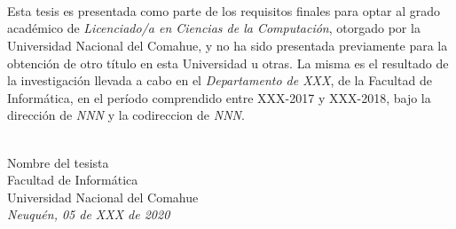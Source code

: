 \ \\
\ \\
\label{pagpref}
\\
\ \\
\ \\
\ \\
\ \\
\ \\

Esta tesis es presentada como parte de los requisitos finales para optar al grado académico de {\em Licenciado/a en Ciencias de la Computación}, otorgado por la Universidad Nacional del Comahue, y no ha sido presentada previamente para la obtención de otro título en esta Universidad u otras. La misma es el resultado de la investigación llevada a cabo en el \emph{Departamento de XXX}, de la Facultad de Informática, en el período comprendido entre XXX-2017 y XXX-2018, bajo la dirección de \emph{NNN} y la codireccion de \emph{NNN}.



\vspace{3cm}


\ \\
{\flushright Nombre del tesista\\
{\sc Facultad de Informática \\
Universidad Nacional del Comahue}\\
{\em Neuqu\'en, 05 de XXX de 2020}\\}

\vfill

